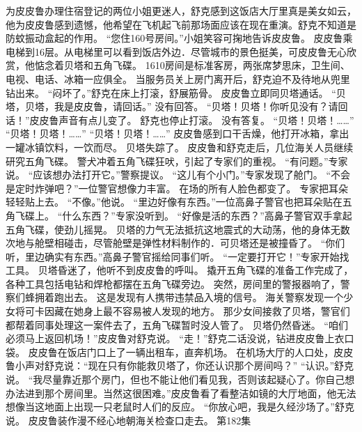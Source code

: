 \documentclass[a4paper,12pt,UTF8,twoside]{ctexbook}
\begin{document}
        为皮皮鲁办理住宿登记的两位小姐更迷人，舒克感到这饭店大厅里真是美女如云，他为皮皮鲁感到遗憾，他希望在飞机起飞前那场面应该在现在重演。舒克不知道是防蚊振动盒起的作用。 
        “您住160号房间。”小姐笑容可掬地告诉皮皮鲁。 
        皮皮鲁乘电梯到16层。从电梯里可以看到饭店外边．尽管城市的景色挺美，可皮皮鲁无心欣赏，他惦念着贝塔和五角飞碟。 
        1610房间是标准客房，两张席梦思床，卫生间、电视、电话、冰箱一应俱全。 
        当服务员关上房门离开后，舒克迫不及待地从兜里钻出来。 
        “闷坏了。”舒克在床上打滚，舒展筋骨。 
        皮皮鲁立即同贝塔通话。 
        “贝塔，贝塔，我是皮皮鲁，请回话。” 
        没有回答。 
        “贝塔！贝塔！你听见没有？请回话！”皮皮鲁声音有点儿变了。 
        舒克也停止打滚。 
        没有答复。 
        “贝塔！贝塔！……” 
        “贝塔！贝塔！……” 
        “贝塔！贝塔！……” 
        皮皮鲁感到口干舌燥，他打开冰箱，拿出一罐冰镇饮料，一饮而尽。 
        贝塔失踪了。 
        皮皮鲁和舒克走后，几位海关人员继续研究五角飞碟。 
        警犬冲着五角飞碟狂吠，引起了专家们的重视。 
        “有问题。”专家说。 
        “应该想办法打开它。”警察提议。 
        “这儿有个小门。”专家发现了舱门。 
        “不会是定时炸弹吧？”一位警官想像力丰富。 
        在场的所有人脸色都变了。 
        专家把耳朵轻轻贴上去。 
        “不像。”他说。 
        “里边好像有东西。”一位高鼻子警官也把耳朵贴在五角飞碟上。 
        “什么东西？”专家没听到。 
        “好像是活的东西？”高鼻子警官双手拿起五角飞碟，使劲儿摇晃。 
        贝塔的力气无法抵抗这地震式的大动荡，他的身体无数次地与舱壁相碰击，尽管舱壁是弹性材料制作的．可贝塔还是被撞昏了。 
        “你们听，里边确实有东西。”高鼻子警官摇给同事们听。 
        “一定要打开它！”专家开始找工具。 
        贝塔昏迷了，他听不到皮皮鲁的呼叫。 
        撬开五角飞碟的准备工作完成了，各种工具包括电钻和焊枪都摆在五角飞碟旁边。 
        突然，房间里的警报器响了，警察们蜂拥着跑出去。 
        这是发现有人携带违禁品入境的信号。 
        海关警察发现一个少女将可卡因藏在她身上最不容易被人发现的地方。 
        那少女间接救了贝塔，警官们都帮着同事处理这一案件去了，五角飞碟暂时没人管了。 
        贝塔仍然昏迷。 
        “咱们必须马上返回机场！”皮皮鲁对舒克说。 
        “走！”舒克二话没说，钻进皮皮鲁上衣口袋。 
        皮皮鲁在饭店门口上了一辆出租车，直奔机场。 
        在机场大厅的人口处，皮皮鲁小声对舒克说：“现在只有你能救贝塔了，你还认识那个房间吗？” 
        “认识。”舒克说。 
        “我尽量靠近那个房门，但也不能让他们看见我，否则该起疑心了。你自己想办法进到那个房间里。当然这很困难。”皮皮鲁看了看整洁如镜的大厅地面，他无法想像当这地面上出现一只老鼠时人们的反应。 
        “你放心吧，我是久经沙场了。”舒克说。 
        皮皮鲁装作漫不经心地朝海关检查口走去。   第182集 
\end{document}
